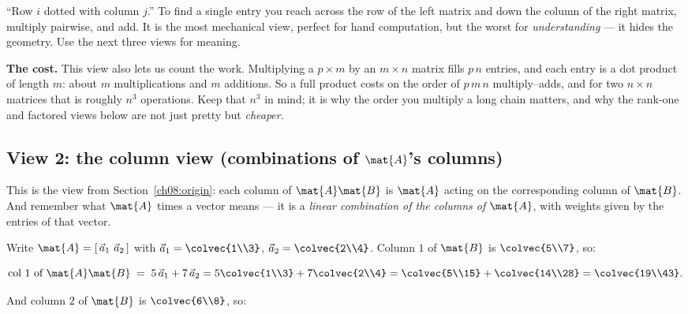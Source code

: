 \begin{intuitionbox}
``Row $i$ dotted with column $j$.'' To find a single entry you reach across the row of
the left matrix and down the column of the right matrix, multiply pairwise, and add.
It is the most mechanical view, perfect for hand computation, but the worst for
\emph{understanding} --- it hides the geometry. Use the next three views for meaning.
\end{intuitionbox}

\begin{marginnotebox}
\textbf{The cost.} This view also lets us count the work. Multiplying a $p\times m$ by an
$m\times n$ matrix fills $p\,n$ entries, and each entry is a dot product of length $m$:
about $m$ multiplications and $m$ additions. So a full product costs on the order of
$p\,m\,n$ multiply--adds, and for two $n\times n$ matrices that is roughly $n^3$
operations. Keep that $n^3$ in mind; it is why the order you multiply a long chain
matters, and why the rank-one and factored views below are not just pretty but
\emph{cheaper}.
\end{marginnotebox}

\subsection{View 2: the column view (combinations of $\mat{A}$'s columns)}

This is the view from Section~\ref{ch08:origin}: each column of $\mat{A}\mat{B}$ is
$\mat{A}$ acting on the corresponding column of $\mat{B}$. And remember what $\mat{A}$
times a vector means --- it is a \emph{linear combination of the columns of $\mat{A}$},
with weights given by the entries of that vector.

Write $\mat{A} = [\,\vec{a}_1 \ \vec{a}_2\,]$ with $\vec{a}_1 = \colvec{1\\3}$,
$\vec{a}_2 = \colvec{2\\4}$. Column $1$ of $\mat{B}$ is $\colvec{5\\7}$, so:

\[
\text{col 1 of } \mat{A}\mat{B} \;=\; 5\,\vec{a}_1 + 7\,\vec{a}_2
= 5\colvec{1\\3} + 7\colvec{2\\4}
= \colvec{5\\15} + \colvec{14\\28} = \colvec{19\\43}.
\]

And column $2$ of $\mat{B}$ is $\colvec{6\\8}$, so:

